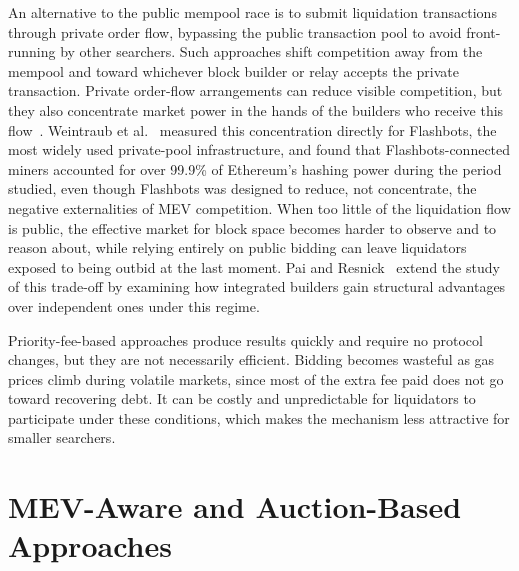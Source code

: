 \documentclass{llncs}
\begin{document}
An alternative to the public mempool race is to submit liquidation
transactions through private order flow, bypassing the public
transaction pool to avoid front-running by other searchers. Such
approaches shift competition away from the mempool and toward whichever
block builder or relay accepts the private transaction. Private
order-flow arrangements can reduce visible competition, but they also
concentrate market power in the hands of the builders who receive this
flow~\cite{wang2024private}. Weintraub et al.~\cite{weintraub2022flashbot}
measured this concentration directly for Flashbots, the most widely used
private-pool infrastructure, and found that Flashbots-connected miners
accounted for over 99.9\% of Ethereum's hashing power during the period
studied, even though Flashbots was designed to reduce, not concentrate,
the negative externalities of MEV competition. When too little of the
liquidation flow is public, the effective market for block space becomes
harder to observe and to reason about, while relying entirely on public
bidding can leave liquidators exposed to being outbid at the last
moment. Pai and Resnick~\cite{pai2023structural} extend the study of
this trade-off by examining how integrated builders gain structural
advantages over independent ones under this regime.

Priority-fee-based approaches produce results quickly and require no
protocol changes, but they are not necessarily efficient. Bidding
becomes wasteful as gas prices climb during volatile markets, since most
of the extra fee paid does not go toward recovering debt. It can be
costly and unpredictable for liquidators to participate under these
conditions, which makes the mechanism less attractive for smaller
searchers.

\section{MEV-Aware and Auction-Based Approaches}
\end{document}
